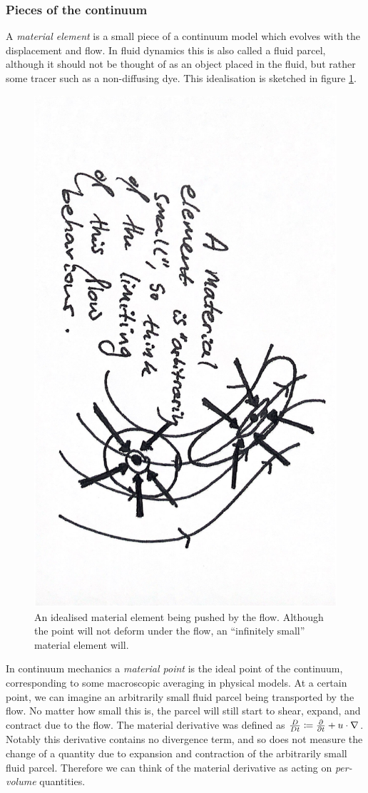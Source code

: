 \subsubsection{Pieces of the continuum}
A \textit{material element} is a small piece of a continuum model which evolves with the displacement and flow.
In fluid dynamics this is also called a fluid parcel, although it should not be thought of as an object placed in the fluid, but
rather some tracer such as a non-diffusing dye.
This idealisation is sketched in figure \ref{sketch_material_element}.
\begin{figure}[H]
\centerline{\includegraphics[angle=90,page=1,width=0.55\linewidth]{figures/2.pdf}}
\caption{An idealised material element being pushed by the flow.
    Although the point will not deform under the flow, an ``infinitely small'' material element will.
}
\label{sketch_material_element}
\end{figure}
In continuum mechanics a \textit{material point} is the ideal point of the continuum, corresponding to some macroscopic averaging in physical models.
At a certain point, we can imagine an arbitrarily small fluid parcel being transported by the flow.
No matter how small this is, the parcel will still start to shear, expand, and contract due
to the flow.
The material derivative was defined as $\frac{D}{Dt} \coloneqq \frac{\partial }{\partial t} + u\cdot\nabla$. Notably this derivative contains no divergence term, and so does not
measure the
change of a quantity due to expansion and contraction of the arbitrarily small fluid parcel. Therefore we can think of the material derivative as acting
on \textit{per-volume} quantities.

